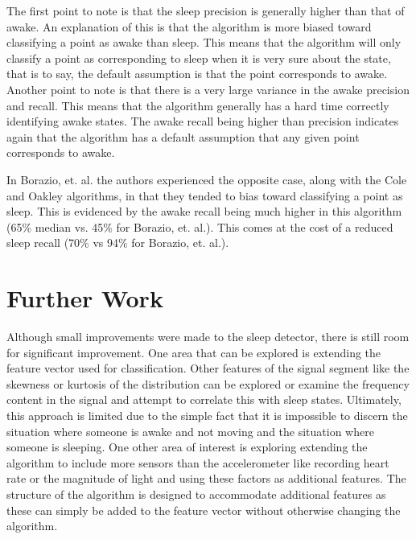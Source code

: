             The first point to note is that the sleep precision is generally higher than that of awake. An explanation of this is that the algorithm is more biased toward classifying a point as awake than sleep. This means that the algorithm will only classify a point as corresponding to sleep when it is very sure about the state, that is to say, the default assumption is that the point corresponds to awake. Another point to note is that there is a very large variance in the awake precision and recall. This means that the algorithm generally has a hard time correctly identifying awake states. The awake recall being higher than precision indicates again that the algorithm has a default assumption that any given point corresponds to awake. 

            In Borazio, et. al. the authors experienced the opposite case, along with the Cole \cite{cole} and Oakley \cite{oakley} algorithms, in that they tended to bias toward classifying a point as sleep. This is evidenced by the awake recall being much higher in this algorithm (65\% median vs. 45\% for Borazio, et. al.). This comes at the cost of a reduced sleep recall (70\% vs 94\% for Borazio, et. al.).


    \chapter{Further Work}

        Although small improvements were made to the sleep detector, there is still room for significant improvement. One area that can be explored is extending the feature vector used for classification. Other features of the signal segment like the skewness or kurtosis of the distribution can be explored or examine the frequency content in the signal and attempt to correlate this with sleep states. Ultimately, this approach is limited due to the simple fact that it is impossible to discern the situation where someone is awake and not moving and the situation where someone is sleeping. One other area of interest is exploring extending the algorithm to include more sensors than the accelerometer like recording heart rate or the magnitude of light and using these factors as additional features. The structure of the algorithm is designed to accommodate additional features as these can simply be added to the feature vector without otherwise changing the algorithm.